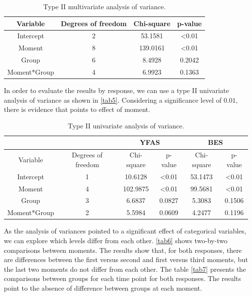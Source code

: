 \documentclass[Review,sagev,times, doublespace]{sagej}
\begin{document}
\begin{table}[h]
\centering
\begin{tabular}{cccc}
\hline
Variable      & Degrees of freedom & Chi-square   & p-value        \\ \hline
Intercept     & 2                  & 53.1581      & \textless 0.01 \\
Moment        & 8                  & 139.0161     & \textless 0.01 \\
Group         & 6                  & 8.4928       & 0.2042         \\
Moment*Group  & 4                  & 6.9923       & 0.1363         \\ \hline
\end{tabular}
\caption{Type II multivariate analysis of variance.}
\label{tab4}
\end{table}

In order to evaluate the results by response, we can use a type II univariate analysis of variance as shown in \autoref{tab5}. Considering a significance level of $0.01$, there is evidence that points to effect of moment.

\begin{table}[h]
\centering
\begin{tabular}{c|c|cc|cc}
\hline
              &                    & \multicolumn{2}{c|}{YFAS}     & \multicolumn{2}{c}{BES}       \\ \hline
Variable      & Degrees of freedom & Chi-square   & p-value        & Chi-square   & p-value        \\ \hline
Intercept     & 1                  & 10.6128      & \textless 0.01 & 53.1473      & \textless 0.01 \\
Moment        & 4                  & 102.9875     & \textless 0.01 & 99.5681      & \textless 0.01 \\
Group         & 3                  & 6.6837       & 0.0827         & 5.3083       & 0.1506         \\
Moment*Group  & 2                  & 5.5984       & 0.0609         & 4.2477       & 0.1196         \\ \hline
\end{tabular}
\caption{Type II univariate analysis of variance.}
\label{tab5}
\end{table}

As the analysis of variances pointed to a significant effect of categorical variables, we can explore which levels differ from each other. \autoref{tab6} shows two-by-two comparisons between moments. The results show that, for both responses, there are differences between the first versus second and first versus third moments, but the last two moments do not differ from each other. The table \autoref{tab7} presents the comparisons between groups for each time point for both responses. The results point to the absence of difference between groups at each moment.
\end{document}
